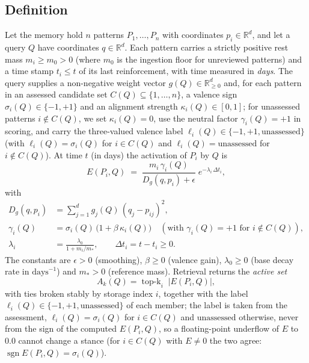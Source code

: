 \documentclass[11pt]{article}
\theoremstyle{remark}
\newcommand{\act}{E}
\newcommand{\dist}{D_g}
\newcommand{\R}{\mathbb{R}}
\begin{document}
\subsection{Definition}

Let the memory hold $n$ patterns $P_1,\dots,P_n$ with coordinates $p_i\in\R^d$, and let a query $Q$ have coordinates $q\in\R^d$. Each pattern carries a strictly positive rest mass $m_i \ge m_0 > 0$ (where $m_0$ is the ingestion floor for unreviewed patterns) and a time stamp $t_i \le t$ of its last reinforcement, with time measured in \emph{days}. The query supplies a non-negative weight vector $g(Q)\in\R^d_{\ge 0}$ and, for each pattern in an assessed candidate set $C(Q)\subseteq\{1,\dots,n\}$, a valence sign $\sigma_i(Q)\in\{-1,+1\}$ and an alignment strength $\kappa_i(Q)\in[0,1]$; for unassessed patterns $i\notin C(Q)$, we set $\kappa_i(Q)=0$, use the neutral factor $\gamma_i(Q)=+1$ in scoring, and carry the three-valued valence label $\ell_i(Q)\in\{-1,+1,\text{unassessed}\}$ (with $\ell_i(Q)=\sigma_i(Q)$ for $i\in C(Q)$ and $\ell_i(Q)=\text{unassessed}$ for $i\notin C(Q)$). At time $t$ (in days) the activation of $P_i$ by $Q$ is
\begin{equation}
\label{eq:field}
\act(P_i,Q) \;=\; \frac{m_i\,\gamma_i(Q)}{\dist(q,p_i)+\epsilon}\;e^{-\lambda_i\,\Delta t_i},
\end{equation}
with
\begin{align}
\dist(q,p_i) &= \sum_{j=1}^{d} g_j(Q)\,(q_j-p_{ij})^2, \label{eq:metric}\\
\gamma_i(Q) &= \sigma_i(Q)\,\bigl(1+\beta\,\kappa_i(Q)\bigr) \quad (\text{with }\gamma_i(Q)=+1\text{ for }i\notin C(Q)), \label{eq:valence}\\
\lambda_i &= \frac{\lambda_0}{1+m_i/m_\ast}, \qquad \Delta t_i = t-t_i \ge 0. \label{eq:decay}
\end{align}
The constants are $\epsilon>0$ (smoothing), $\beta\ge 0$ (valence gain), $\lambda_0\ge 0$ (base decay rate in $\text{days}^{-1}$) and $m_\ast>0$ (reference mass). Retrieval returns the \emph{active set}
\begin{equation}
\label{eq:activeset}
A_k(Q) = \operatorname{top\text{-}k}_i\;|\act(P_i,Q)|,
\end{equation}
with ties broken stably by storage index $i$, together with the label $\ell_i(Q)\in\{-1,+1,\text{unassessed}\}$ of each member; the label is taken from the assessment, $\ell_i(Q)=\sigma_i(Q)$ for $i\in C(Q)$ and $\text{unassessed}$ otherwise, never from the sign of the computed $\act(P_i,Q)$, so a floating-point underflow of $\act$ to $0.0$ cannot change a stance (for $i\in C(Q)$ with $\act\neq 0$ the two agree: $\operatorname{sgn}\act(P_i,Q)=\sigma_i(Q)$).
\end{document}
